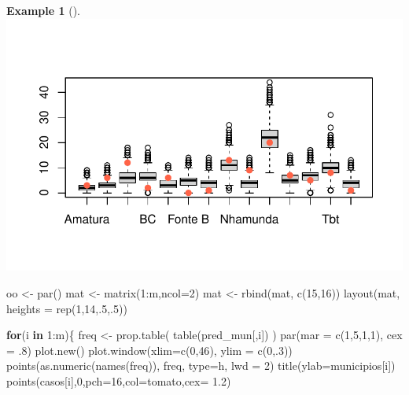 \documentclass[
  letterpaper,
  DIV=11,
  numbers=noendperiod]{scrreprt}
\newenvironment{Shaded}{\begin{snugshade}}{\end{snugshade}}
\newcommand{\AttributeTok}[1]{\textcolor[rgb]{0.40,0.45,0.13}{#1}}
\newcommand{\ControlFlowTok}[1]{\textcolor[rgb]{0.00,0.23,0.31}{\textbf{#1}}}
\newcommand{\DecValTok}[1]{\textcolor[rgb]{0.68,0.00,0.00}{#1}}
\newcommand{\FloatTok}[1]{\textcolor[rgb]{0.68,0.00,0.00}{#1}}
\newcommand{\FunctionTok}[1]{\textcolor[rgb]{0.28,0.35,0.67}{#1}}
\newcommand{\NormalTok}[1]{\textcolor[rgb]{0.00,0.23,0.31}{#1}}
\newcommand{\OtherTok}[1]{\textcolor[rgb]{0.00,0.23,0.31}{#1}}
\newcommand{\SpecialCharTok}[1]{\textcolor[rgb]{0.37,0.37,0.37}{#1}}
\newcommand{\StringTok}[1]{\textcolor[rgb]{0.13,0.47,0.30}{#1}}
\theoremstyle{definition}
\theoremstyle{plain}
\theoremstyle{definition}
\newtheorem{example}{Example}[chapter]
\theoremstyle{remark}
\begin{document}
\begin{example}[]
\includegraphics{poisson_files/figure-pdf/unnamed-chunk-3-1.pdf}

\begin{Shaded}
\begin{Highlighting}[]
\NormalTok{oo }\OtherTok{\textless{}{-}} \FunctionTok{par}\NormalTok{()}
\NormalTok{mat }\OtherTok{\textless{}{-}} \FunctionTok{matrix}\NormalTok{(}\DecValTok{1}\SpecialCharTok{:}\NormalTok{m,}\AttributeTok{ncol=}\DecValTok{2}\NormalTok{)}
\NormalTok{mat }\OtherTok{\textless{}{-}} \FunctionTok{rbind}\NormalTok{(mat, }\FunctionTok{c}\NormalTok{(}\DecValTok{15}\NormalTok{,}\DecValTok{16}\NormalTok{))}
\FunctionTok{layout}\NormalTok{(mat, }\AttributeTok{heights =} \FunctionTok{rep}\NormalTok{(}\DecValTok{1}\NormalTok{,}\DecValTok{14}\NormalTok{,.}\DecValTok{5}\NormalTok{,.}\DecValTok{5}\NormalTok{))}

\ControlFlowTok{for}\NormalTok{(i }\ControlFlowTok{in} \DecValTok{1}\SpecialCharTok{:}\NormalTok{m)\{}
\NormalTok{  freq }\OtherTok{\textless{}{-}} \FunctionTok{prop.table}\NormalTok{( }\FunctionTok{table}\NormalTok{(pred\_mun[,i]) )}
  \FunctionTok{par}\NormalTok{(}\AttributeTok{mar =} \FunctionTok{c}\NormalTok{(}\DecValTok{1}\NormalTok{,}\DecValTok{5}\NormalTok{,}\DecValTok{1}\NormalTok{,}\DecValTok{1}\NormalTok{), }\AttributeTok{cex =}\NormalTok{ .}\DecValTok{8}\NormalTok{)}
  \FunctionTok{plot.new}\NormalTok{()}
  \FunctionTok{plot.window}\NormalTok{(}\AttributeTok{xlim=}\FunctionTok{c}\NormalTok{(}\DecValTok{0}\NormalTok{,}\DecValTok{46}\NormalTok{), }\AttributeTok{ylim =} \FunctionTok{c}\NormalTok{(}\DecValTok{0}\NormalTok{,.}\DecValTok{3}\NormalTok{))}
  \FunctionTok{points}\NormalTok{(}\FunctionTok{as.numeric}\NormalTok{(}\FunctionTok{names}\NormalTok{(freq)), freq, }\AttributeTok{type=}\StringTok{\textquotesingle{}h\textquotesingle{}}\NormalTok{, }\AttributeTok{lwd =} \DecValTok{2}\NormalTok{)}
  \FunctionTok{title}\NormalTok{(}\AttributeTok{ylab=}\NormalTok{municipios[i])}
  \FunctionTok{points}\NormalTok{(casos[i],}\DecValTok{0}\NormalTok{,}\AttributeTok{pch=}\DecValTok{16}\NormalTok{,}\AttributeTok{col=}\StringTok{\textquotesingle{}tomato\textquotesingle{}}\NormalTok{,}\AttributeTok{cex=} \FloatTok{1.2}\NormalTok{)}
  

\end{Highlighting}
\end{Shaded}
\end{example}
\end{document}
